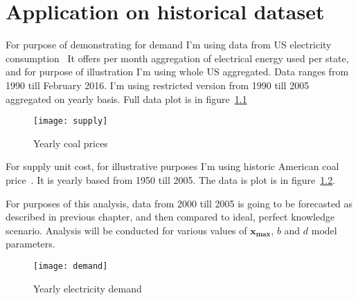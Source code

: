 
\chapter{Application on historical dataset}
\label{chap:Application on historical dataset}

For purpose of demonstrating for demand I'm using data from US electricity consumption~\autocite{us-elec} It offers per month aggregation of electrical energy used per state, and for purpose of illustration I'm using whole US aggregated. Data ranges from 1990 till February 2016. I'm using restricted version from 1990 till 2005 aggregated on yearly basis. Full data plot is in figure~\ref{fig:supply}

\begin{figure}[]
  \centering
  \texttt{[image: supply]}
  \caption{Yearly coal prices}
  \label{fig:supply}
\end{figure}

For supply unit cost, for illustrative purposes I'm using historic American coal price~\autocite{us-coal}. It is yearly based from 1950 till 2005. The data is plot is in figure~\ref{fig:demand}.

For purposes of this analysis, data from 2000 till 2005 is going to be forecasted as described in previous chapter, and then compared to ideal, perfect knowledge scenario. Analysis will be conducted for various values of $\mathbf{x_{\max}}$, $b$ and $d$ model parameters.

\begin{figure}[]
  \centering
  \texttt{[image: demand]}
  \caption{Yearly electricity demand}
  \label{fig:demand}
\end{figure}
